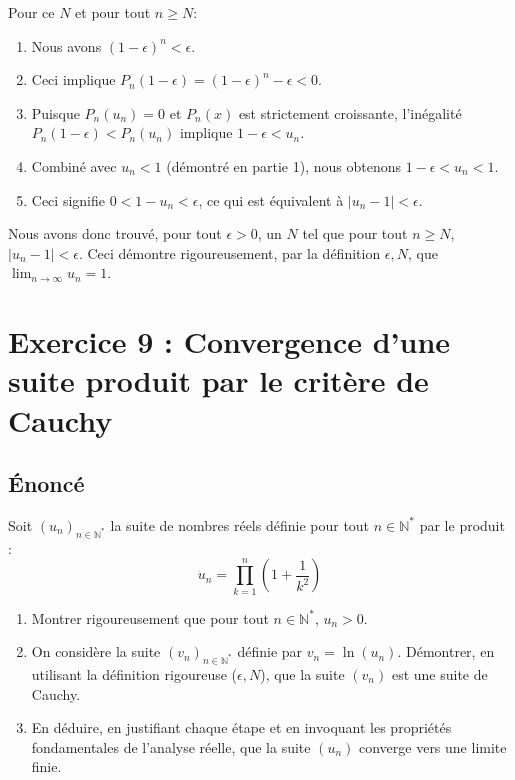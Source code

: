 \documentclass[a4paper,11pt]{report}
\begin{document}
Pour ce $N$ et pour tout $n \ge N$:
\begin{enumerate}
\item Nous avons $(1 - \epsilon)^n < \epsilon$.

\item Ceci implique $P_n(1 - \epsilon) = (1 - \epsilon)^n - \epsilon < 0$.

\item Puisque $P_n(u_n) = 0$ et $P_n(x)$ est strictement croissante, l'inégalité $P_n(1 - \epsilon) < P_n(u_n)$ implique $1 - \epsilon < u_n$.

\item Combiné avec $u_n < 1$ (démontré en partie 1), nous obtenons $1 - \epsilon < u_n < 1$.

\item Ceci signifie $0 < 1 - u_n < \epsilon$, ce qui est équivalent à $|u_n - 1| < \epsilon$.
\end{enumerate}

Nous avons donc trouvé, pour tout $\epsilon > 0$, un $N$ tel que pour tout $n \ge N$, $|u_n - 1| < \epsilon$.
Ceci démontre rigoureusement, par la définition $\epsilon, N$, que $\lim_{n \to \infty} u_n = 1$.

\vspace{1cm}

\section*{Exercice 9 : Convergence d'une suite produit par le critère de Cauchy}
\subsection*{Énoncé}
Soit $(u_n)_{n \in \mathbb{N}^*}$ la suite de nombres réels définie pour tout $n \in \mathbb{N}^*$ par le produit :
$$u_n = \prod_{k=1}^n \left(1 + \frac{1}{k^2}\right)$$
\begin{enumerate}
\item Montrer rigoureusement que pour tout $n \in \mathbb{N}^*$, $u_n > 0$.

\item On considère la suite $(v_n)_{n \in \mathbb{N}^*}$ définie par $v_n = \ln(u_n)$. Démontrer, en utilisant la définition rigoureuse ($\epsilon, N$), que la suite $(v_n)$ est une suite de Cauchy.

\item En déduire, en justifiant chaque étape et en invoquant les propriétés fondamentales de l'analyse réelle, que la suite $(u_n)$ converge vers une limite finie.
\end{enumerate}
\end{document}
